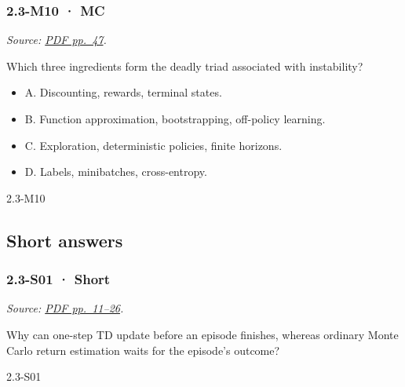 \noindent\begin{minipage}{\linewidth}

\subsubsection{2.3-M10 · MC}\label{m10-mc-5}

\emph{Source:
\href{../Lecture\%20Slides/2.3.\%20Q-learning.pdf\#page=47}{PDF
pp.~47}.}

Which three ingredients form the deadly triad associated with
instability?

\begin{itemize}
\tightlist
\item
  A. Discounting, rewards, terminal states.
\item
  B. Function approximation, bootstrapping, off-policy learning.
\item
  C. Exploration, deterministic policies, finite horizons.
\item
  D. Labels, minibatches, cross-entropy.
\end{itemize}

\begin{solution}[8mm]{2.3-M10}

\end{solution}
\end{minipage}\par\medskip

\subsection{Short answers}\label{short-answers-5}

\noindent\begin{minipage}{\linewidth}

\subsubsection{2.3-S01 · Short}\label{s01-short-5}

\emph{Source:
\href{../Lecture\%20Slides/2.3.\%20Q-learning.pdf\#page=11}{PDF
pp.~11--26}.}

Why can one-step TD update before an episode finishes, whereas ordinary
Monte Carlo return estimation waits for the episode's outcome?

\begin{solution}[20mm]{2.3-S01}

\end{solution}
\end{minipage}\par\medskip

